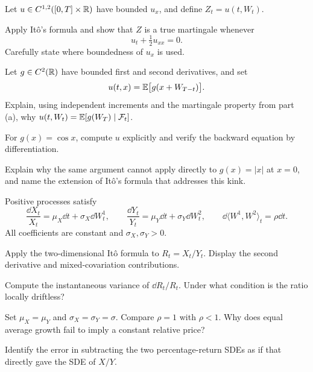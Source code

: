 \begin{exercise}
Let \(u\in C^{1,2}([0,T]\times\mathbb{R})\) have bounded \(u_x\), and define
\(Z_t=u(t,W_t)\).
\begin{exparts}
  \item Apply It\^o's formula and show that \(Z\) is a true martingale
  whenever
  \[
  u_t+\tfrac12u_{xx}=0.
  \]
  Carefully state where boundedness of \(u_x\) is used.
  \item Let \(g\in C^2(\mathbb{R})\) have bounded first and second derivatives,
  and set
  \[
  u(t,x)=\mathbb E\bigl[g(x+W_{T-t})\bigr].
  \]
  Explain, using independent increments and the martingale property from
  part (a), why \(u(t,W_t)=\mathbb E[g(W_T)\mid\mathcal F_t]\).
  \item For \(g(x)=\cos x\), compute \(u\) explicitly and verify the
  backward equation by differentiation.
  \item Explain why the same argument cannot apply directly to
  \(g(x)=|x|\) at \(x=0\), and name the extension of It\^o's formula
  that addresses this kink.
\end{exparts}
\end{exercise}

\begin{exercise}
Positive processes satisfy
\[
\frac{\dd X_t}{X_t}=\mu_X\dd t+\sigma_X\dd W_t^1,\qquad
\frac{\dd Y_t}{Y_t}=\mu_Y\dd t+\sigma_Y\dd W_t^2,\qquad
\dd\langle W^1,W^2\rangle_t=\rho\dd t.
\]
All coefficients are constant and \(\sigma_X,\sigma_Y>0\).
\begin{exparts}
\item Apply the two-dimensional It\^o formula to \(R_t=X_t/Y_t\). Display the second derivative and mixed-covariation contributions.
\item Compute the instantaneous variance of \(\dd R_t/R_t\). Under what condition is the ratio locally driftless?
\item Set \(\mu_X=\mu_Y\) and \(\sigma_X=\sigma_Y=\sigma\). Compare \(\rho=1\) with \(\rho<1\). Why does equal average growth fail to imply a constant relative price?
\item Identify the error in subtracting the two percentage-return SDEs as if that directly gave the SDE of \(X/Y\).
\end{exparts}
\end{exercise}
\fi

\ifIncludeFurther
{}
